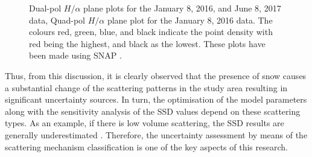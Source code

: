 \documentclass[12pt]{elsarticle}
\numberwithin{equation}{section}
\numberwithin{figure}{section}
\numberwithin{table}{section}
\begin{document}
\begin{figure}[htb]
\begin{subfigure}[t]{0.49\textwidth}
        \caption{}
        \label{subfig:ha_jan_quad}
    \end{subfigure}
    \caption{\doublespacing Dual-pol $H/{\alpha}$ plane plots for the  January 8, 2016, and  June 8, 2017 data,  Quad-pol $H/{\alpha}$ plane plot for the January 8, 2016 data. The colours red, green, blue, and black indicate the point density with red being the highest, and black as the lowest. These plots have been made using SNAP \citep{ESA2019}.}
    \label{fig:ha_res}
\end{figure}

Thus, from this discussion, it is clearly observed that the presence of snow causes a substantial change of the scattering patterns in the study area resulting in significant uncertainty sources. In turn, the optimisation of the model parameters along with the sensitivity analysis of the SSD values depend on these scattering types. As an example, if there is low volume scattering, the SSD results are generally underestimated \citep{Cloude2005, Hajnsek2009, Kugler2015}. Therefore, the uncertainty assessment by means of the scattering mechanism classification is one of the key aspects of this research.
\FloatBarrier
\end{document}
